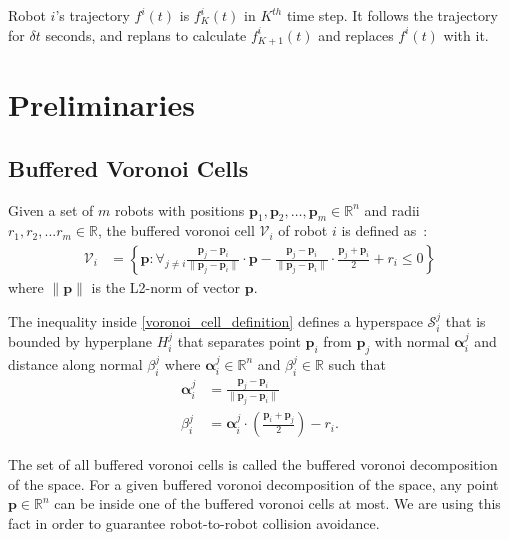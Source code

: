 \documentclass{svproc}
\newcommand{\vp}{\mathbf{p}}
\newcommand{\valpha}{\mathbf{\alpha}}
\newcommand{\cV}{\mathcal{V}}
\newcommand{\cS}{\mathcal{S}}
\newcommand{\R}{\mathbb{R}} %
\begin{document}
Robot $i$'s trajectory $f^i(t)$ is $f_K^i(t)$ in $K^{th}$ time step. It follows the trajectory for $\delta t$ seconds, and replans to calculate $f_{K+1}^i(t)$ and replaces $f^i(t)$ with it.

\section{Preliminaries}

\subsection{Buffered Voronoi Cells}
Given a set of $m$ robots with positions $\vp_1,\vp_2,\ldots,\vp_m \in \R^n$ and radii $r_1,r_2,...r_m \in \R$, the buffered voronoi cell $\cV_i$ of robot $i$ is defined as~\cite{bufferedVoronoiCells}:
\begin{align}
    \cV_i &= \left\{\vp : \forall_{j\neq i} \frac{\vp_j-\vp_i}{\|\vp_j-\vp_i\|}\cdot \vp - \frac{\vp_j-\vp_i}{\|\vp_j-\vp_i\|}\cdot \frac{\vp_j+\vp_i}{2} + r_i\leq 0 \right\} \label{voronoi_cell_definition}
\end{align}
where $\|\vp\|$ is the L2-norm of vector $\vp$.

The inequality inside \eqref{voronoi_cell_definition} defines a hyperspace $\cS_i^j$ that is bounded by hyperplane $H_i^j$ that separates point $\vp_i$ from $\vp_j$ with normal $\valpha_i^j$ and distance along normal $\beta_i^j$ where $\valpha_i^j\in \R^n$ and $\beta_i^j\in \R$ such that
\begin{align*}
    \valpha_i^j &= \frac{\vp_j - \vp_i}{\|\vp_j-\vp_i\|}\\
    \beta_i^j &= \valpha_i^j \cdot \left(\frac{\vp_i + \vp_j}{2}\right) - r_i.
\end{align*}

The set of all buffered voronoi cells is called the buffered voronoi decomposition of the space. For a given buffered voronoi decomposition of the space, any point $\vp\in \R^n$ can be inside one of the buffered voronoi cells at most. We are using this fact in order to guarantee robot-to-robot collision avoidance.
\end{document}
